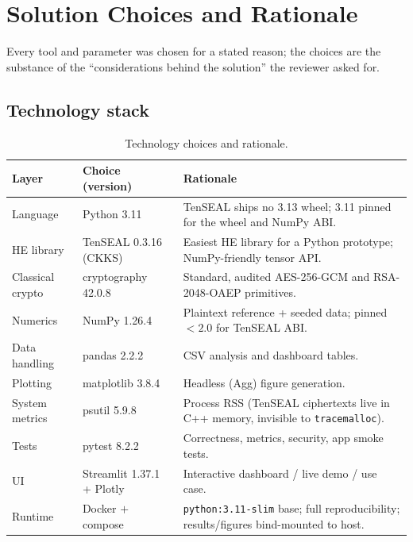 \documentclass[11pt,a4paper]{article}
\begin{document}
\section{Solution Choices and Rationale}
\label{sec:choices}

Every tool and parameter was chosen for a stated reason; the choices are the
substance of the ``considerations behind the solution'' the reviewer asked for.

\subsection{Technology stack}

\begin{table}[H]
\centering
\caption{Technology choices and rationale.}
\begin{tabularx}{\linewidth}{@{}p{2.6cm}p{2.7cm}X@{}}
\toprule
\textbf{Layer} & \textbf{Choice (version)} & \textbf{Rationale}\\
\midrule
Language        & Python 3.11        & TenSEAL ships no 3.13 wheel; 3.11 pinned for the wheel and NumPy ABI.\\
HE library      & TenSEAL 0.3.16 (CKKS) & Easiest HE library for a Python prototype; NumPy-friendly tensor API.\\
Classical crypto& cryptography 42.0.8 & Standard, audited AES-256-GCM and RSA-2048-OAEP primitives.\\
Numerics        & NumPy 1.26.4       & Plaintext reference + seeded data; pinned $<2.0$ for TenSEAL ABI.\\
Data handling   & pandas 2.2.2       & CSV analysis and dashboard tables.\\
Plotting        & matplotlib 3.8.4   & Headless (Agg) figure generation.\\
System metrics  & psutil 5.9.8       & Process RSS (TenSEAL ciphertexts live in C++ memory, invisible to \texttt{tracemalloc}).\\
Tests           & pytest 8.2.2       & Correctness, metrics, security, app smoke tests.\\
UI              & Streamlit 1.37.1 + Plotly & Interactive dashboard / live demo / use case.\\
Runtime         & Docker $+$ compose & \texttt{python:3.11-slim} base; full reproducibility; results/figures bind-mounted to host.\\
\bottomrule
\end{tabularx}
\end{table}
\end{document}
